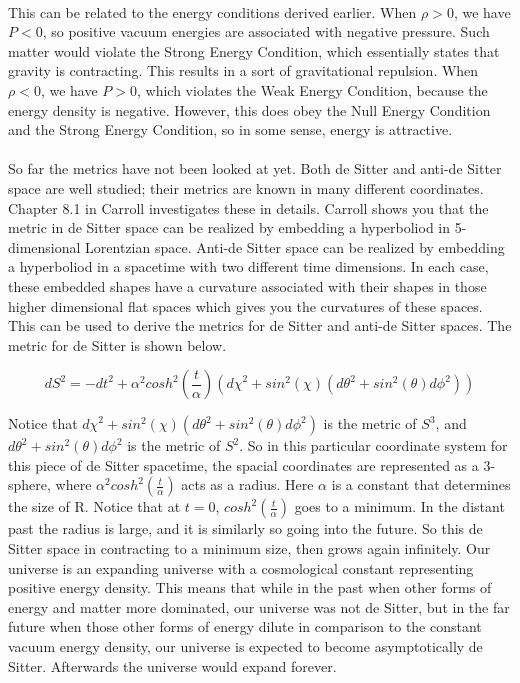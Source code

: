 \documentclass[10pt]{article}
\begin{document}
    \paragraph{} This can be related to the energy conditions derived earlier. When $\rho > 0$, we have $P < 0$, so positive vacuum energies are associated with negative pressure. Such matter would violate the Strong Energy Condition, which essentially states that gravity is contracting. This results in a sort of gravitational repulsion. When $\rho < 0$, we have $P>0$, which violates the Weak Energy Condition, because the energy density is negative. However, this does obey the Null Energy Condition and the Strong Energy Condition, so in some sense, energy is attractive. 
    
    \paragraph{} So far the metrics have not been looked at yet. Both de Sitter and anti-de Sitter space are well studied; their metrics are known in many different coordinates. Chapter 8.1 in Carroll investigates these in details. Carroll shows you that the metric in de Sitter space can be realized by embedding a hyperboliod in 5-dimensional Lorentzian space. Anti-de Sitter space can be realized by embedding a hyperboliod in a spacetime with two different time dimensions. In each case, these embedded shapes have a curvature associated with their shapes in those higher dimensional flat spaces which gives you the curvatures of these spaces. This can be used to derive the metrics for de Sitter and anti-de Sitter spaces. The metric for de Sitter is shown below.
    
    \begin{equation}
        {dS}^{2} = -{dt}^{2} + {\alpha}^{2}{cosh}^{2}(\frac{t}{\alpha})({d\chi}^{2} + {sin}^{2}(\chi)({d\theta}^{2} + {sin}^{2}(\theta){d\phi}^{2}))
    \end{equation}
    
    Notice that ${d\chi}^{2} + {sin}^{2}(\chi)({d\theta}^{2} + {sin}^{2}(\theta){d\phi}^{2})$ is the metric of ${S}^{3}$, and ${d\theta}^{2} + {sin}^{2}(\theta){d\phi}^{2}$ is the metric of ${S}^{2}$. So in this particular coordinate system for this piece of de Sitter spacetime, the spacial coordinates are represented as a 3-sphere, where ${\alpha}^{2}{cosh}^{2}(\frac{t}{\alpha})$ acts as a radius. Here $\alpha$ is a constant that determines the size of R. Notice that at $t=0$, ${cosh}^{2}(\frac{t}{\alpha})$ goes to a minimum. In the distant past the radius is large, and it is similarly so going into the future. So this de Sitter space in contracting to a minimum size, then grows again infinitely. Our universe is an expanding universe with a cosmological constant representing positive energy density. This means that while in the past when other forms of energy and matter more dominated, our universe was not de Sitter, but in the far future when those other forms of energy dilute in comparison to the constant vacuum energy density, our universe is expected to become asymptotically de Sitter. Afterwards the universe would expand forever. 
    
\end{document}
